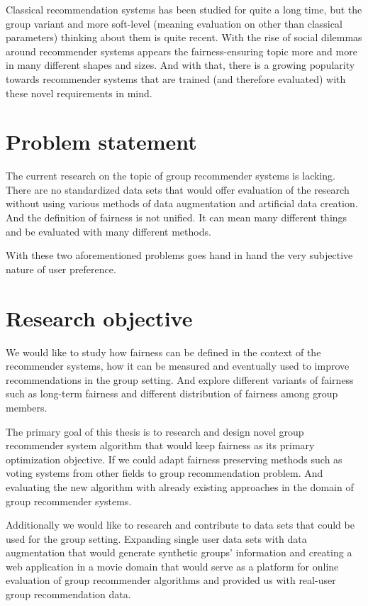 Classical recommendation systems has been studied for quite a long time, but the group variant and more soft-level (meaning evaluation on other than classical parameters) thinking about them is quite recent. With the rise of social dilemmas around recommender systems appears the fairness-ensuring topic more and more in many different shapes and sizes. And with that, there is a growing popularity towards recommender systems that are trained (and therefore evaluated) with these novel requirements in mind.




\section{Problem statement}
The current research on the topic of group recommender systems is lacking. There are no standardized data sets that would offer evaluation of the research without using various methods of data augmentation and artificial data creation.
And the definition of fairness is not unified. It can mean many different things and be evaluated with many different methods.

With these two aforementioned problems goes hand in hand the very subjective nature of user preference.

\section{Research objective}

We would like to study how fairness can be defined in the context of the recommender systems, how it can be measured and eventually used to improve recommendations in the group setting. And explore different variants of fairness such as long-term fairness and different distribution of fairness among group members. 

The primary goal of this thesis is to research and design novel group recommender system algorithm that would keep fairness as its primary optimization objective. If we could adapt fairness preserving methods such as voting systems from other fields to group recommendation problem. And evaluating the new algorithm with already existing approaches in the domain of group recommender systems.

Additionally we would like to research and contribute to data sets that could be used for the group setting. Expanding single user data sets with data augmentation that would generate synthetic groups' information and creating a web application in a movie domain that would serve as a platform for online evaluation of group recommender algorithms and provided us with real-user group recommendation data.

